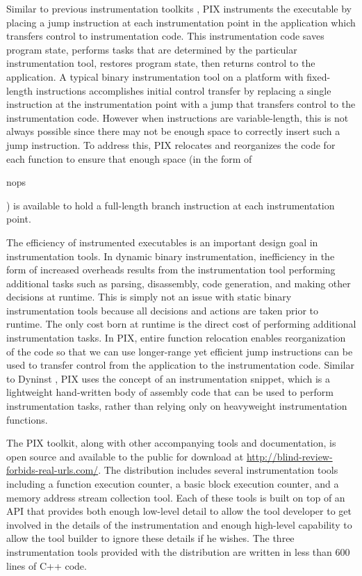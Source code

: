 Similar to previous instrumentation toolkits \cite{buck2000api}, PIX instruments the executable 
by placing a jump instruction at each instrumentation
point in the application which transfers control to instrumentation code. This instrumentation code saves
program state, performs tasks that are determined by the particular instrumentation tool,
restores program state, then returns control to the application.
A typical binary instrumentation tool on a platform with fixed-length instructions 
\cite{tikir2006pmac} accomplishes initial control transfer by replacing a
single instruction at the instrumentation point with a jump that transfers
control to the instrumentation code. However when instructions are variable-length,
this is not always possible since there may not be enough space to correctly 
insert such a jump instruction. To address this, PIX
relocates and reorganizes the code for each function to ensure that enough
space (in the form of \begin{it}nops\end{it}) is available to hold a full-length branch instruction at each
instrumentation point.

The efficiency of instrumented executables is an important design goal in instrumentation tools. In dynamic binary instrumentation,
inefficiency in the form of increased overheads results from the instrumentation tool performing additional tasks such 
as parsing, disassembly, code generation, and making other decisions at runtime. This
is simply not an issue with static binary instrumentation tools because all
decisions and actions are taken prior to runtime. The only cost born at runtime is the direct
cost of performing additional instrumentation tasks. In PIX, entire function relocation
enables reorganization of the code so that we
can use longer-range yet efficient jump instructions can be used to transfer control from the
application to the instrumentation code. Similar to Dyninst \cite{buck2000api}, PIX uses the concept of an
instrumentation snippet, which is a lightweight hand-written body of assembly code that can
be used to perform instrumentation tasks, rather than relying only on heavyweight
instrumentation functions.

The PIX toolkit, along with other accompanying tools and documentation,
is open source and available to the public for download 
at \url{http://blind-review-forbids-real-urls.com/}. The distribution includes several instrumentation tools 
including a function execution counter, a basic block
execution counter, and a memory address stream collection tool. Each of these tools is built on top of
an API that provides both enough low-level detail to allow the tool developer to get involved in the 
details of the instrumentation and enough high-level capability to allow the tool builder
to ignore these details if he wishes. The three instrumentation tools provided with the distribution are written in
less than 600 lines of C++ code.

